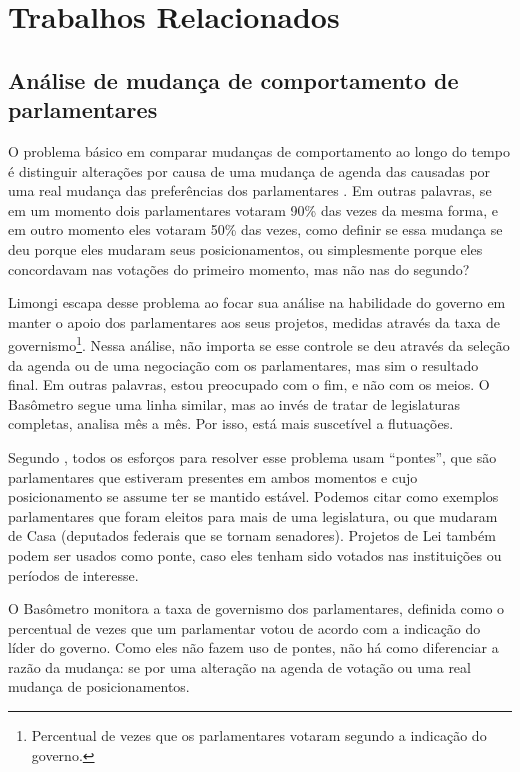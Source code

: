 \chapter{Trabalhos Relacionados}\label{cap:relacionados}


\section{Análise de mudança de comportamento de parlamentares}

O problema básico em comparar mudanças de comportamento ao longo do tempo é
distinguir alterações por causa de uma mudança de agenda das causadas por uma
real mudança das preferências dos parlamentares \cite{Bailey2007}. Em outras
palavras, se em um momento dois parlamentares votaram 90\% das vezes da mesma
forma, e em outro momento eles votaram 50\% das vezes, como definir se essa
mudança se deu porque eles mudaram seus posicionamentos, ou simplesmente porque
eles concordavam nas votações do primeiro momento, mas não nas do segundo?

Limongi escapa desse problema ao focar sua análise na habilidade do governo em
manter o apoio dos parlamentares aos seus projetos, medidas através da taxa de
governismo\footnote{Percentual de vezes que os parlamentares votaram segundo a
indicação do governo.}. Nessa análise, não importa se esse controle se deu
através da seleção da agenda ou de uma negociação com os parlamentares, mas sim
o resultado final. Em outras palavras, estou preocupado com o fim, e não com os
meios. O Basômetro segue uma linha similar, mas ao invés de tratar de
legislaturas completas, analisa mês a mês. Por isso, está mais suscetível a
flutuações.

Segundo , todos os esforços para resolver esse problema
usam ``pontes'', que são parlamentares que estiveram presentes em ambos
momentos e cujo posicionamento se assume ter se mantido estável. Podemos citar
como exemplos parlamentares que foram eleitos para mais de uma legislatura, ou
que mudaram de Casa (deputados federais que se tornam senadores). Projetos de
Lei também podem ser usados como ponte, caso eles tenham sido votados nas
instituições ou períodos de interesse.

O Basômetro monitora a taxa de governismo dos parlamentares, definida como o
percentual de vezes que um parlamentar votou de acordo com a indicação do líder
do governo. Como eles não fazem uso de pontes, não há como diferenciar a razão
da mudança: se por uma alteração na agenda de votação ou uma real mudança de
posicionamentos.

